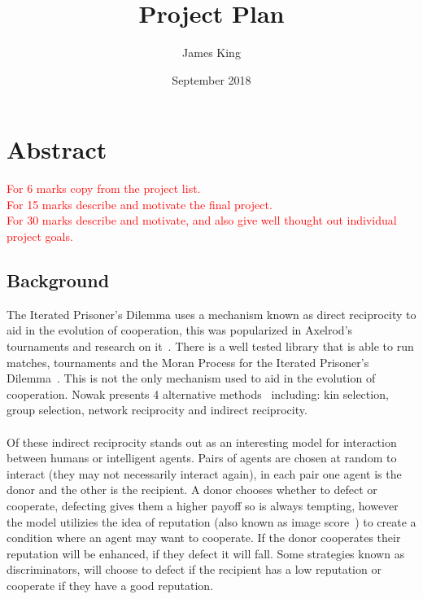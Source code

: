 \documentclass{article}
\title{Project Plan}
\author{James King}
\date{September 2018}
\begin{document}
\maketitle

\section*{Abstract}

\textcolor{red}{For 6 marks copy from the project list.\\For 15 marks describe and motivate the final project.\\For 30 marks describe and motivate, and also give well thought out individual project goals.}

\subsection*{Background}
The Iterated Prisoner's Dilemma uses a mechanism known as direct reciprocity to aid in the evolution of cooperation, this was popularized in Axelrod's tournaments and research on it~\cite{evolution_of_cooperation}. There is a well tested library that is able to run matches, tournaments and the Moran Process for the Iterated Prisoner's Dilemma~\cite{axelrodproject}. This is not the only mechanism used to aid in the evolution of cooperation. Nowak presents 4 alternative methods~\cite{five_rules_coop} including: kin selection, group selection, network reciprocity and indirect reciprocity.\\\\
Of these indirect reciprocity stands out as an interesting model for interaction between humans or intelligent agents. Pairs of agents are chosen at random to interact (they may not necessarily interact again), in each pair one agent is the donor and the other is the recipient. A donor chooses whether to defect or cooperate, defecting gives them a higher payoff so is always tempting, however the model utilizies the idea of reputation (also known as image score~\cite{evol_indirect_image}) to create a condition where an agent may want to cooperate. If the donor cooperates their reputation will be enhanced, if they defect it will fall. Some strategies known as discriminators, will choose to defect if the recipient has a low reputation or cooperate if they have a good reputation.\\\\
\end{document}
